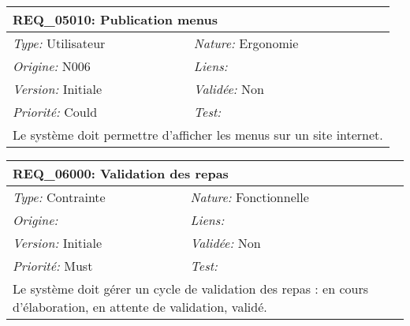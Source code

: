\begin{table}[!ht]

\begin{tabular}{|p{60mm}p{100mm}|}

\hline

\multicolumn{2}{|l|}{\textbf{REQ\_05010:} Publication menus} \\ \hline

\emph{Type:} Utilisateur & \emph{Nature:} Ergonomie \\

\emph{Origine:} N006 & \emph{Liens:}  \\

\emph{Version:} Initiale & \emph{Validée:} Non \\

\emph{Priorité:} Could & \emph{Test:} \\ \hline

\multicolumn{2}{|p{16cm}|}{Le système doit permettre d'afficher les menus sur un site internet.} \\ \hline

\end{tabular}

\end{table}



\begin{table}[!ht]

\begin{tabular}{|p{60mm}p{100mm}|}

\hline

\multicolumn{2}{|l|}{\textbf{REQ\_06000:} Validation des repas} \\ \hline

\emph{Type:} Contrainte & \emph{Nature:} Fonctionnelle \\

\emph{Origine:}  & \emph{Liens:}  \\

\emph{Version:} Initiale & \emph{Validée:} Non \\

\emph{Priorité:} Must & \emph{Test:} \\ \hline

\multicolumn{2}{|p{16cm}|}{Le système doit gérer un cycle de validation des repas : en cours d'élaboration, en attente de validation, validé.} \\ \hline

\end{tabular}

\end{table}



